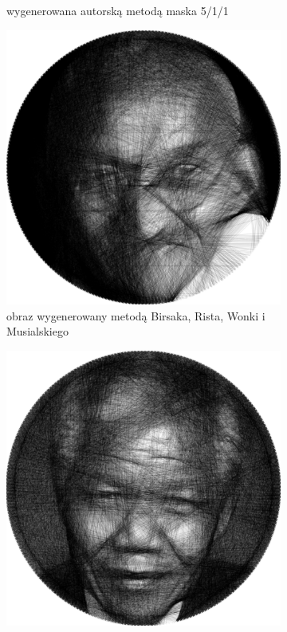 \begin{figure}[H]
\begin{subfigure}{0.24\textwidth}
            \caption{wygenerowana autorską metodą maska 5/1/1}
            \label{comp-comp-gandhi-mandela-d}
        \end{subfigure}
        \begin{subfigure}{0.24\textwidth}
            \centering
            \includegraphics[width = \textwidth]{img/6-comp/gandhi_birsak_.png}
            \caption{obraz wygenerowany metodą Birsaka, Rista, Wonki i Musialskiego}
            \label{comp-comp-gandhi-mandela-e}
        \end{subfigure}
        \begin{subfigure}{0.24\textwidth}
            \centering
            \includegraphics[width = \textwidth]{img/6-comp/mandela_birsak_.png}

\end{subfigure}
\end{figure}
